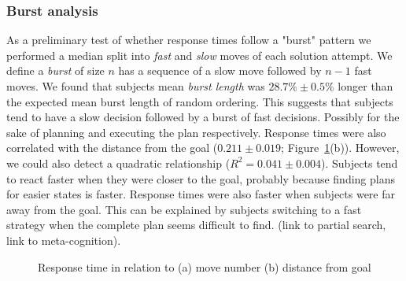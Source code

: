 \documentclass[10pt,letterpaper]{article}
\begin{document}
\subsubsection{Burst analysis}
As a preliminary test of whether response times follow a "burst" pattern we performed a median split into \emph{fast} and \emph{slow} moves of each solution attempt. We define a \emph{burst} of size $n$ has a sequence of a slow move followed by $n-1$ fast moves. We found that subjects mean \emph{burst length} was $28.7\% \pm 0.5\%$ longer than the expected mean burst length of random ordering. This suggests that subjects tend to have a slow decision followed by a burst of fast decisions. Possibly for the sake of planning and executing the plan respectively. 
Response times were also correlated with the distance from the goal ($0.211\pm0.019$; Figure~\ref{fig:rt}(b)).
However, we could also detect a quadratic relationship ($R^2=0.041\pm0.004$). Subjects tend to react faster when they were closer to the goal, probably because finding plans for easier states is faster. Response times were also faster when subjects were far away from the goal. This can be explained by subjects switching to a fast strategy when the complete plan seems difficult to find. (link to partial search, link to meta-cognition).
\begin{figure}[t]
\vspace{-0.03cm}
	\centering
\vspace{-0.1cm}
	\caption{Response time in relation to (a) move number (b)  distance from goal} 
\vspace{-0.55cm}
	\label{fig:rt}
\end{figure}
\end{document}
